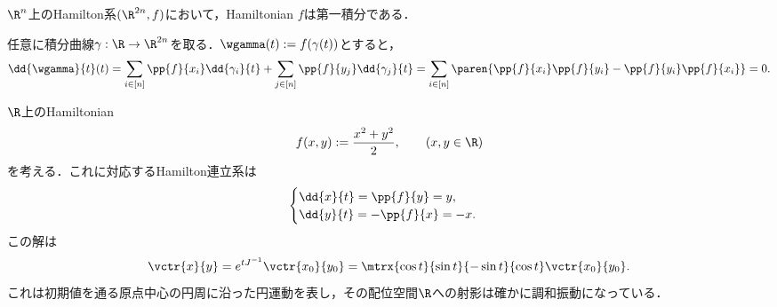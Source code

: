 \documentclass[uplatex,dvipdfmx]{jsreport}
\begin{document}
\begin{theorem}
    $\R^n$上のHamilton系$(\R^{2n},f)$において，Hamiltonian $f$は第一積分である．
\end{theorem}
\begin{Proof}
    任意に積分曲線$\gamma:\R\to\R^{2n}$を取る．$\wgamma(t):=f(\gamma(t))$とすると，
    \[\dd{\wgamma}{t}(t)=\sum_{i\in[n]}\pp{f}{x_i}\dd{\gamma_i}{t}+\sum_{j\in[n]}\pp{f}{y_j}\dd{\gamma_j}{t}=\sum_{i\in[n]}\paren{\pp{f}{x_i}\pp{f}{y_i}-\pp{f}{y_i}\pp{f}{x_i}}=0.\]
\end{Proof}

\begin{example}[調和振動子]
    $\R$上のHamiltonian
    \[f(x,y):=\frac{x^2+y^2}{2},\qquad(x,y\in\R)\]
    を考える．これに対応するHamilton連立系は
    \[\begin{cases}
        \dd{x}{t}=\pp{f}{y}=y,\\
        \dd{y}{t}=-\pp{f}{x}=-x.
    \end{cases}\]
    この解は
    \[\vctr{x}{y}=e^{tJ^{-1}}\vctr{x_0}{y_0}=\mtrx{\cos t}{\sin t}{-\sin t}{\cos t}\vctr{x_0}{y_0}.\]
    これは初期値を通る原点中心の円周に沿った円運動を表し，その配位空間$\R$への射影は確かに調和振動になっている．
\end{example}

\clearpage
\end{document}
